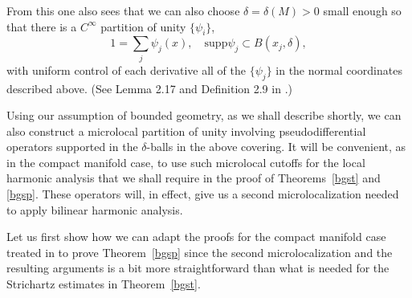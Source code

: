 \documentclass[10pt]{amsart}
\newcommand{\supp}{\mathrm{supp }}
\newcommand{\1}{{\bf 1}}
\begin{document}
From this one also sees that we can
also choose $\delta=\delta(M)>0$ small enough so that there is a $C^\infty$ partition of unity $\{\psi_i\}$,
\begin{equation}\label{b.1}
1=\sum_j \psi_j(x), \quad \supp \psi_j\subset B(x_j,\delta),
\end{equation}
with uniform control of each derivative all of the $\{\psi_j\}$ in the normal coordinates described above.
(See Lemma 2.17 and 
Definition 2.9 in \cite{normhyp}.)






Using our assumption of bounded geometry, as we shall describe shortly, we can also construct a microlocal partition of unity involving 
pseudodifferential operators supported in the $\delta$-balls in the above covering.  It will be convenient, as in
the compact manifold case, to use such microlocal cutoffs for the local harmonic analysis that we shall
require in the proof of Theorems~\ref{bgst} and \ref{bgsp}.  These operators will, in effect, give us a
second microlocalization needed to apply bilinear harmonic analysis.






Let us first show how we can adapt the proofs for the compact manifold case treated
in \cite{HSp} to prove Theorem~\ref{bgsp} since the second microlocalization and
the resulting arguments is a bit more straightforward than what is needed for the
Strichartz estimates in Theorem~\ref{bgst}.
\end{document}
